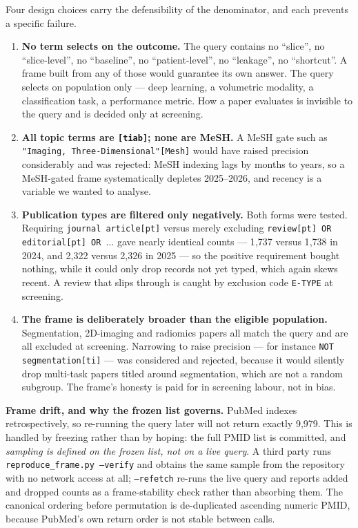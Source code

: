 \documentclass[11pt,a4paper]{article}
\begin{document}
Four design choices carry the defensibility of the denominator, and each prevents a
specific failure.

\begin{enumerate}
\item \textbf{No term selects on the outcome.} The query contains no ``slice'', no
``slice-level'', no ``baseline'', no ``patient-level'', no ``leakage'', no
``shortcut''. A frame built from any of those would guarantee its own answer. The
query selects on population only --- deep learning, a volumetric modality, a
classification task, a performance metric. How a paper evaluates is invisible to the
query and is decided only at screening.

\item \textbf{All topic terms are \texttt{[tiab]}; none are MeSH.} A MeSH gate such as
\texttt{"Imaging, Three-Dimensional"[Mesh]} would have raised precision
considerably and was rejected: MeSH indexing lags by months to years, so a MeSH-gated
frame systematically depletes 2025--2026, and recency is a variable we wanted to
analyse.

\item \textbf{Publication types are filtered only negatively.} Both forms were
tested. Requiring \texttt{journal article[pt]} versus merely excluding
\texttt{review[pt] OR editorial[pt] OR $\ldots$} gave nearly identical counts ---
1{,}737 versus 1{,}738 in 2024, and 2{,}322 versus 2{,}326 in 2025 --- so the
positive requirement bought nothing, while it could only drop records not yet typed,
which again skews recent. A review that slips through is caught by exclusion code
\texttt{E-TYPE} at screening.

\item \textbf{The frame is deliberately broader than the eligible population.}
Segmentation, 2D-imaging and radiomics papers all match the query and are all
excluded at screening. Narrowing to raise precision --- for instance
\texttt{NOT segmentation[ti]} --- was considered and rejected, because it would
silently drop multi-task papers titled around segmentation, which are not a random
subgroup. The frame's honesty is paid for in screening labour, not in bias.
\end{enumerate}

\textbf{Frame drift, and why the frozen list governs.} PubMed indexes
retrospectively, so re-running the query later will not return exactly 9{,}979.
This is handled by freezing rather than by hoping: the full PMID list is committed,
and \emph{sampling is defined on the frozen list, not on a live query}. A third party
runs \texttt{reproduce\_frame.py --verify} and obtains the same sample from the
repository with no network access at all; \texttt{--refetch} re-runs the live query
and reports added and dropped counts as a frame-stability check rather than absorbing
them. The canonical ordering before permutation is de-duplicated ascending numeric
PMID, because PubMed's own return order is not stable between calls.
\end{document}
